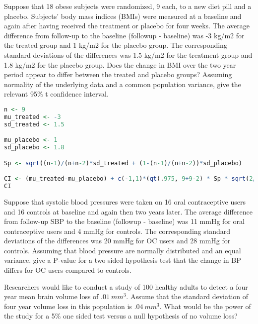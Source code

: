 \documentclass{homework}
\begin{document}
\begin{tcolorbox}[title=Question 6]
Suppose that 18 obese subjects were randomized, 9 each, to a new diet pill and a placebo. Subjects’ body mass indices (BMIs) were measured at a baseline and again after having received the treatment or placebo for four weeks. The average difference from follow-up to the baseline (followup - baseline) was -3 kg/m2 for the treated group and 1 kg/m2 for the placebo group. The corresponding standard deviations of the differences was 1.5 kg/m2 for the treatment group and 1.8 kg/m2 for the placebo group. Does the change in BMI over the two year period appear to differ between the treated and placebo groups?  Assuming normality of the underlying data and a common population variance, give the relevant 95\% t confidence interval.
\end{tcolorbox}

\begin{lstlisting}[language=R]
n <- 9
mu_treated <- -3
sd_treated <- 1.5

mu_placebo <- 1
sd_placebo <- 1.8

Sp <- sqrt((n-1)/(n+n-2)*sd_treated + (1-(n-1)/(n+n-2))*sd_placebo)

CI <- (mu_treated-mu_placebo) + c(-1,1)*(qt(.975, 9+9-2) * Sp * sqrt(2/n))
CI
\end{lstlisting}

\begin{tcolorbox}[title=Question 7]
Suppose that systolic blood pressures were taken on 16 oral contraceptive users and 16 controls at baseline and again then two years later. The average difference from follow-up SBP to the baseline (followup - baseline) was 11 mmHg for oral contraceptive users and 4 mmHg for controls. The corresponding standard deviations of the differences was 20 mmHg for OC users and 28 mmHg for controls. Assuming that blood pressure are normally distributed and an equal variance, give a P-value for a two sided hypothesis test that the change in BP differs for OC users compared to controls.
\end{tcolorbox}

\begin{tcolorbox}[title=Question 8]
Researchers would like to conduct a study of 100 healthy adults to detect a four year mean brain volume loss of $.01~mm^3$. Assume that the standard deviation of four year volume loss in this population is $.04~mm^3$. What would be the power of the study for a 5\% one sided test versus a null hypothesis of no volume loss?
\end{tcolorbox}
\end{document}
